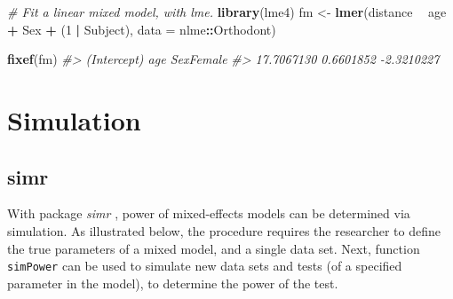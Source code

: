 \documentclass[]{book}
\newenvironment{Shaded}{\begin{snugshade}}{\end{snugshade}}
\newcommand{\KeywordTok}[1]{\textcolor[rgb]{0.13,0.29,0.53}{\textbf{#1}}}
\newcommand{\DataTypeTok}[1]{\textcolor[rgb]{0.13,0.29,0.53}{#1}}
\newcommand{\DecValTok}[1]{\textcolor[rgb]{0.00,0.00,0.81}{#1}}
\newcommand{\StringTok}[1]{\textcolor[rgb]{0.31,0.60,0.02}{#1}}
\newcommand{\CommentTok}[1]{\textcolor[rgb]{0.56,0.35,0.01}{\textit{#1}}}
\newcommand{\OperatorTok}[1]{\textcolor[rgb]{0.81,0.36,0.00}{\textbf{#1}}}
\newcommand{\NormalTok}[1]{#1}
\begin{document}
\begin{Shaded}
\begin{Highlighting}[]
\CommentTok{# Fit a linear mixed model, with lme.}
\KeywordTok{library}\NormalTok{(lme4)}
\NormalTok{fm <-}\StringTok{ }\KeywordTok{lmer}\NormalTok{(distance }\OperatorTok{~}\StringTok{ }\NormalTok{age }\OperatorTok{+}\StringTok{ }\NormalTok{Sex }\OperatorTok{+}\StringTok{ }\NormalTok{(}\DecValTok{1} \OperatorTok{|}\StringTok{ }\NormalTok{Subject), }\DataTypeTok{data =}\NormalTok{ nlme}\OperatorTok{::}\NormalTok{Orthodont)}

\KeywordTok{fixef}\NormalTok{(fm)}
\CommentTok{#> (Intercept)         age   SexFemale }
\CommentTok{#>  17.7067130   0.6601852  -2.3210227}
\end{Highlighting}
\end{Shaded}

\section{Simulation}\label{simulation}

\subsection{simr}\label{simr}


With package \emph{simr} \citep{Green2016}, power of mixed-effects
models can be determined via simulation. As illustrated below, the
procedure requires the researcher to define the true parameters of a
mixed model, and a single data set. Next, function \texttt{simPower} can
be used to simulate new data sets and tests (of a specified parameter in
the model), to determine the power of the test.
\end{document}
